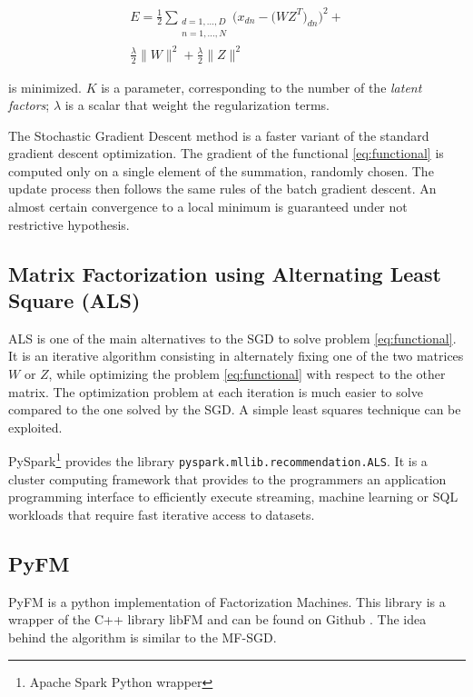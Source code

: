\documentclass[10pt,conference,compsocconf]{IEEEtran}
\begin{document}
\begin{multline}
\label{eq:functional}
E = \frac{1}{2} \sum_{\substack{d=1,...,D \\n=1,...,N}} 
\bigg( x_{dn} - \big( WZ^T \big)_{dn} \bigg) ^2 + \\ 
\frac{\lambda}{2}\|W\|^2 + \frac{\lambda}{2}\|Z\|^2
\end{multline} 

is minimized. $K$ is a parameter,
corresponding to the number of the \textit{latent factors}; $\lambda$ is a scalar 
that weight the regularization terms.

The Stochastic Gradient Descent method is a faster variant of the standard gradient descent
optimization. The gradient of the functional \ref{eq:functional} is computed only on a single
element of the summation, randomly chosen. The update process then follows the same rules of the batch
gradient descent.
An almost certain convergence to a local minimum is guaranteed under not restrictive hypothesis.

\subsection{Matrix Factorization using Alternating Least Square (ALS)}
ALS is one of the main alternatives to the SGD to solve problem \ref{eq:functional}.
It is an iterative algorithm consisting in alternately fixing one of the two matrices $W$ or $Z$,
while optimizing the problem \ref{eq:functional} with respect to the other matrix.
The optimization problem at each iteration is much easier to solve compared to the one solved by the
SGD. A simple least squares technique can be exploited.

PySpark\footnote{Apache Spark Python wrapper} provides the library \texttt{pyspark.mllib.recommendation.ALS}. It
is a cluster computing framework that provides to the programmers an application programming
interface to efficiently execute streaming, machine learning or SQL workloads that require fast
iterative access to datasets.

\subsection{PyFM}

PyFM is a python implementation of Factorization Machines. This library is a wrapper of the C++ library libFM \cite{rendle:tist2012} and can be found on Github \cite{pyfm}. The idea behind the algorithm is similar to the MF-SGD. 
\end{document}
